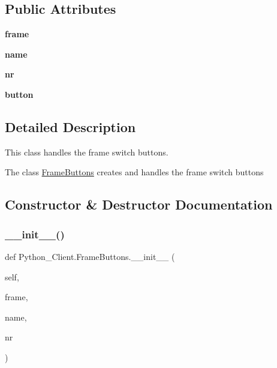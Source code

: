 \subsection*{Public Attributes}
\begin{DoxyCompactItemize}
\item 
\mbox{\label{class_python___client_1_1_frame_buttons_a05df5a686b0be0cfe0f3fec43dd1610b}} 
{\bfseries frame}
\item 
\mbox{\label{class_python___client_1_1_frame_buttons_aebc39e17fde8bc095a65cf5395ae7da3}} 
{\bfseries name}
\item 
\mbox{\label{class_python___client_1_1_frame_buttons_a8578c244ff1c429cf3ee508993ae9ac8}} 
{\bfseries nr}
\item 
\mbox{\label{class_python___client_1_1_frame_buttons_a46d4384e43fbd5c22512088344f90a5f}} 
{\bfseries button}
\end{DoxyCompactItemize}


\subsection{Detailed Description}
This class handles the frame switch buttons. 

The class \mbox{\hyperlink{class_python___client_1_1_frame_buttons}{Frame\+Buttons}} creates and handles the frame switch buttons 

\subsection{Constructor \& Destructor Documentation}
\mbox{\label{class_python___client_1_1_frame_buttons_a903927dea8f58c84d0a28ce980d1914a}} 
\subsubsection{\texorpdfstring{\+\_\+\+\_\+init\+\_\+\+\_\+()}{\_\_init\_\_()}}
{\footnotesize\ttfamily def Python\+\_\+\+Client.\+Frame\+Buttons.\+\_\+\+\_\+init\+\_\+\+\_\+ (\begin{DoxyParamCaption}\item[{}]{self,  }\item[{}]{frame,  }\item[{}]{name,  }\item[{}]{nr }\end{DoxyParamCaption})}



